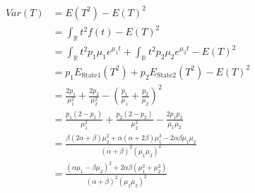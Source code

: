 \begin{align*}
    Var(T) & = E(T^2) - E(T)^2                                                                                                              \\
           & = \int_{\mathbb{R}} t^2f(t) - E(T)^2                                                                                           \\
           & = \int_{\mathbb{R}} t^2p_1\mu_1 e^{\mu_1t}  + \int_{\mathbb{R}} t^2p_2\mu_2 e^{\mu_2t} - E(T)^2                                \\
           & = p_1E_{\text{State1}}(T^2)+p_2E_{\text{State2}}(T^2)   - E(T)^2                                                               \\
           & = \frac{2p_1}{\mu_1^2} + \frac{2p_2}{\mu_2^2} - (\frac{p_1}{\mu_1} + \frac{p_2}{\mu_2})^2                                      \\
           & = \frac{p_1(2 - p_1)}{\mu_1^2} + \frac{p_2(2 - p_2)}{\mu_2^2} - \frac{2p_1p_2}{\mu_1\mu_2}                                     \\
           & = \frac{\beta(2\alpha + \beta)\mu_2^2 + \alpha(\alpha+2\beta)\mu_1^2 - 2\alpha\beta\mu_1\mu_2}{(\alpha+\beta)^2(\mu_1\mu_2)^2} \\
           & = \frac{(\alpha\mu_1 - \beta\mu_2)^2 + 2\alpha\beta(\mu_1^2 + \mu_2^2)}{(\alpha+\beta)^2(\mu_1\mu_2)^2}
\end{align*}
